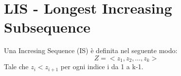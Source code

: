 \chapter{LIS - Longest Increasing Subsequence}
Una Incresing Sequence (IS) è definita nel seguente modo:
\[ Z = <z_1, z_2, \dots, z_k> \]
Tale che $z_i < z_{i+1}$ per ogni indice i da 1 a k-1.